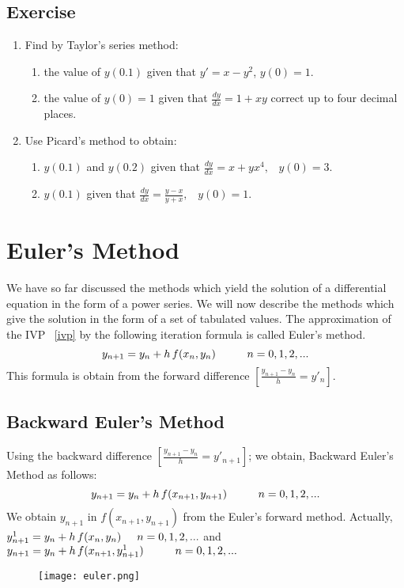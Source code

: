 \documentclass[aima203_lecturenotes_ku.tex]{subfiles}
\begin{document}
\subsection{Exercise}
\begin{enumerate}
    \item Find by Taylor's series method:
\begin{enumerate}
    \item the value of $y(0.1)$ given that $y'=x-y^2$, $y(0)=1$.

    \item the value of $y(0)=1$ given that $\displaystyle \frac{dy}{dx} = 1 + xy$ correct up to four decimal places.
    \end{enumerate}
\item Use Picard's method to obtain:
\begin{enumerate}
    \item $y(0.1)$ and $y(0.2)$ given that $\displaystyle \frac{dy}{dx} = x + yx^4, \;\;\; y(0)=3$.
    \item $y(0.1)$ given that $\displaystyle \frac{dy}{dx} = \frac{y-x}{y+x}, \;\;\; y(0)=1$.
    \end{enumerate}
\end{enumerate}

\section{Euler's Method}
We have so far discussed the methods which yield the solution of a differential equation in the form of a power series. We will now describe the methods which give the solution in the form of a set of tabulated values. The approximation of the IVP ~\ref{ivp} by the following iteration formula is called Euler's method.
\begin{equation}
  \label{eq:9}
  y_{n+1} = y_n + h\,f(x_n,y_n) \hspace{10mm} n=0,1,2,...
\end{equation}
This formula is obtain from the forward difference $\left [ \displaystyle \frac{y_{n+1} -y_n}{h} = y'_{n} \right ]$.

\subsection{Backward Euler's Method}
Using the backward difference $\left [ \displaystyle \frac{y_{n+1} -y_n}{h} = y'_{n+1} \right ]$; we obtain, Backward Euler's Method as follows:
\begin{equation}
  \label{eq:9}
  y_{n+1} = y_n + h\,f(x_{n+1}, y_{n+1}) \hspace{10mm} n=0,1,2,...
\end{equation}
We obtain $y_{n+1}$ in $f(x_{n+1}, y_{n+1})$ from the Euler's forward method. Actually, \\
$y^{1}_{n+1} = y_n + h\,f(x_n,y_n) \hspace{5mm} n=0,1,2,...$ and $y_{n+1} = y_n + h\,f(x_{n+1}, y^{1}_{n+1}) \hspace{10mm} n=0,1,2,...$
\begin{figure}[h]
  \centering
\texttt{[image: euler.png]}
\end{figure}
\end{document}
